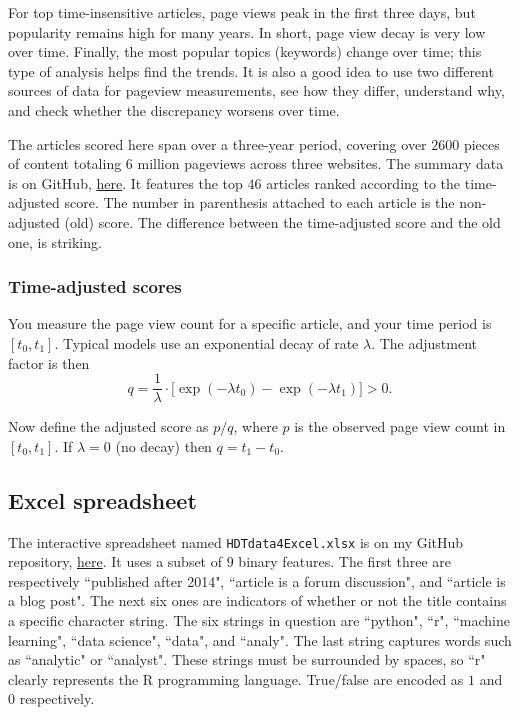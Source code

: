 \documentclass[oneside,10pt]{book}
\begin{document}
For top time-insensitive articles, page views peak in the first three days, but popularity remains high for many years.  In short, page view decay is very low over time. Finally, the most popular topics (keywords) change over time; this type of analysis helps find the trends. It is also a good idea to use two different sources of data for pageview
 measurements, see how they differ, understand why, and check whether the discrepancy worsens over time.

The articles scored here span over a three-year period, covering over $\num{2600}$ pieces of content totaling $6$ million pageviews across three websites.
The summary data is on GitHub, \href{https://github.com/VincentGranville/Machine-Learning/blob/main/Source\%20Code/ArticlePopularity.txt}{here}. It features the top $46$
 articles ranked according to the time-adjusted score. The number in parenthesis attached to each article is the non-adjusted (old) score. The difference between the time-adjusted score and the old one, is striking.

\subsubsection{Time-adjusted scores}

You measure the page view count for a specific article, and your time period is  $[t_0, t_1]$. Typical models use
 an \textcolor{index}{exponential decay} of rate $\lambda$. The adjustment factor is then
 $$q = \frac{1}{\lambda}\cdot \Big[\exp(-\lambda t_0) -  \exp(-\lambda t_1)\Big] > 0.$$


Now define the adjusted score as $p / q$, where $p$ is the observed page view count in $[t_0, t_1]$. If $\lambda = 0$ (no decay) then $q = t_1-t_0$.

\subsection{Excel spreadsheet}\label{excerds}

The interactive spreadsheet named \texttt{HDTdata4Excel.xlsx} is on my GitHub repository, \href{https://github.com/VincentGranville/Machine-Learning/blob/main/Spreadsheets/HDTdata4Excel.xlsx}{here}. It uses a subset of $9$ binary features. The first three are respectively ``published after 2014",
``article is a forum discussion", and ``article is a blog post". The next six ones are indicators of whether or not the title contains a specific character string. The six strings in question are ``python", ``r",  ``machine learning", ``data science", ``data",  and ``analy". The last string captures words such as ``analytic" or
 ``analyst". These strings must be surrounded by spaces, so ``r" clearly represents the R programming language. True/false are encoded as $1$ and $0$ respectively.
\end{document}
